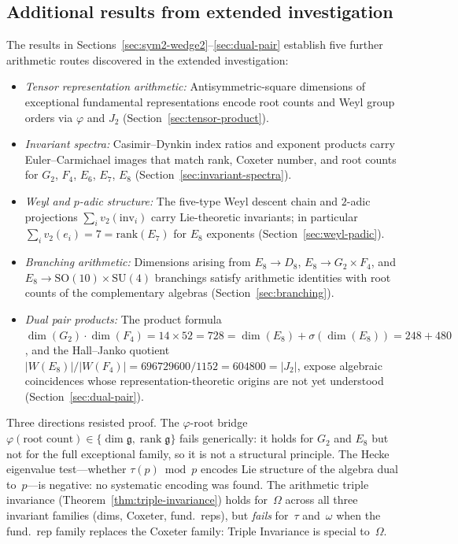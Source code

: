 \documentclass[11pt]{amsart}
\theoremstyle{plain}
\theoremstyle{definition}
\theoremstyle{remark}
\newcommand{\fg}{\mathfrak{g}}
\newcommand{\rank}{\operatorname{rank}}
\begin{document}
\subsection{Additional results from extended investigation}

The results in Sections~\ref{sec:sym2-wedge2}--\ref{sec:dual-pair}
establish five further arithmetic routes discovered in the extended
investigation:
\begin{itemize}
  \item \emph{Tensor representation arithmetic:} Antisymmetric-square
    dimensions of exceptional fundamental representations encode root
    counts and Weyl group orders via $\varphi$ and $J_2$
    (Section~\ref{sec:tensor-product}).
  \item \emph{Invariant spectra:} Casimir--Dynkin index ratios and
    exponent products carry Euler--Carmichael images that match rank,
    Coxeter number, and root counts for $G_2$, $F_4$, $E_6$, $E_7$,
    $E_8$ (Section~\ref{sec:invariant-spectra}).
  \item \emph{Weyl and $p$-adic structure:} The five-type Weyl descent
    chain and $2$-adic projections $\sum_i v_2(\text{inv}_i)$ carry
    Lie-theoretic invariants; in particular $\sum_i v_2(e_i) = 7
    = \mathrm{rank}(E_7)$ for $E_8$ exponents
    (Section~\ref{sec:weyl-padic}).
  \item \emph{Branching arithmetic:} Dimensions arising from
    $E_8 \to D_8$, $E_8 \to G_2 \times F_4$, and $E_8 \to
    \mathrm{SO}(10) \times \mathrm{SU}(4)$ branchings satisfy
    arithmetic identities with root counts of the complementary
    algebras (Section~\ref{sec:branching}).
  \item \emph{Dual pair products:} The product formula
    $\dim(G_2) \cdot \dim(F_4) = 14 \times 52 = 728 = \dim(E_8)
    + \sigma(\dim(E_8)) = 248 + 480$, and the Hall--Janko quotient
    $|W(E_8)|/|W(F_4)| = 696729600/1152 = 604800 = |J_2|$, expose
    algebraic coincidences whose representation-theoretic origins are
    not yet understood (Section~\ref{sec:dual-pair}).
\end{itemize}

Three directions resisted proof.
The $\varphi$-root bridge
$\varphi(\text{root count}) \in \{\dim\fg, \rank\fg\}$
fails generically: it holds for $G_2$ and $E_8$ but not for the full
exceptional family, so it is not a structural principle.
The Hecke eigenvalue test---whether $\tau(p) \bmod p$ encodes Lie
structure of the algebra dual to~$p$---is negative: no systematic
encoding was found.
The arithmetic triple invariance (Theorem~\ref{thm:triple-invariance})
holds for~$\Omega$ across all three invariant families (dims, Coxeter,
fund.\ reps), but \emph{fails} for~$\tau$ and~$\omega$ when the
fund.\ rep family replaces the Coxeter family: Triple Invariance is
special to~$\Omega$.
\end{document}

